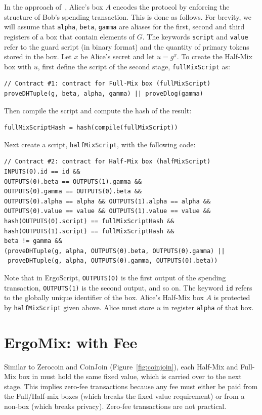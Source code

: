 \documentclass[runningheads]{llncs}
\newcommand{\langname}{ErgoScript\xspace}
\newcommand{\mixname}{ErgoMix\xspace}
\newcommand{\zerocoin}{Zerocoin\xspace}
\begin{document}
In the approach of~\cite{multistage}, Alice's box $A$ encodes the protocol by enforcing the structure of Bob's spending transaction. 
This is done as follows. For brevity, we will assume that \texttt{alpha}, \texttt{beta}, \texttt{gamma} are aliases for the first, second and third registers of a box that contain elements of $G$. The keywords \texttt{script} and \texttt{value} refer to the guard script (in binary format) and the quantity of primary tokens stored in the box. Let $x$ be Alice's secret and let $u = g^x$. To create the Half-Mix box with $u$, first define the script of the second stage, \texttt{fullMixScript} as:
{\small
\begin{Verbatim}[frame=single]
// Contract #1: contract for Full-Mix box (fullMixScript)
proveDHTuple(g, beta, alpha, gamma) || proveDlog(gamma)
\end{Verbatim}
}
Then compile the script and compute the hash of the result:

{\small
\begin{verbatim}
fullMixScriptHash = hash(compile(fullMixScript))
\end{verbatim}
}
Next create a script, \texttt{halfMixScript}, with the following code:
{\small
\begin{Verbatim}[frame=single]
// Contract #2: contract for Half-Mix box (halfMixScript)
INPUTS(0).id == id &&
OUTPUTS(0).beta == OUTPUTS(1).gamma && 
OUTPUTS(0).gamma == OUTPUTS(0).beta && 
OUTPUTS(0).alpha == alpha && OUTPUTS(1).alpha == alpha &&
OUTPUTS(0).value == value && OUTPUTS(1).value == value &&
hash(OUTPUTS(0).script) == fullMixScriptHash &&  
hash(OUTPUTS(1).script) == fullMixScriptHash &&
beta != gamma &&
(proveDHTuple(g, alpha, OUTPUTS(0).beta, OUTPUTS(0).gamma) || 
 proveDHTuple(g, alpha, OUTPUTS(0).gamma, OUTPUTS(0).beta))
\end{Verbatim}
}

Note that in \langname, \texttt{OUTPUTS(0)} is the first output of the spending transaction, \texttt{OUTPUTS(1)} is the second output, and so on. The keyword \texttt{id} refers to the globally unique identifier of the box. Alice's Half-Mix box $A$ is protected by \texttt{halfMixScript} given above. Alice must store $u$ in register \texttt{alpha} of that box.


\section{\mixname: \algname with Fee}
\label{fee}

Similar to \zerocoin and CoinJoin (Figure~\ref{fig:coinjoin}), each Half-Mix and Full-Mix box in \algname must hold the same fixed value, which is carried over to the next stage. This implies zero-fee transactions because any fee must either be paid from the Full/Half-mix boxes (which breaks the fixed value requirement) or from a non-\algname box (which breaks privacy). Zero-fee transactions are not practical. 
\end{document}
